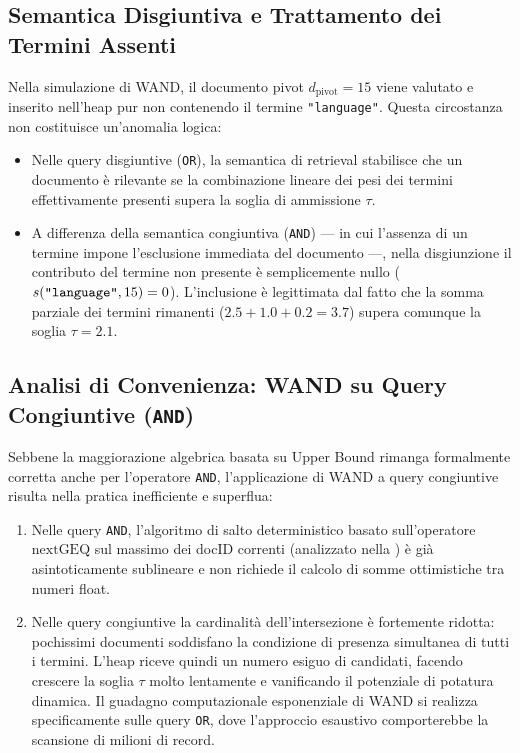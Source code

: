 \FloatBarrier
\subsection{Semantica Disgiuntiva e Trattamento dei Termini Assenti}
Nella simulazione di WAND, il documento pivot $d_{\text{pivot}} = 15$ viene valutato e inserito nell'heap pur non contenendo il termine \texttt{"language"}.  
Questa circostanza non costituisce un'anomalia logica:
\begin{itemize}
    \item Nelle query disgiuntive (\texttt{OR}), la semantica di retrieval stabilisce che un documento \`e rilevante se la combinazione lineare dei pesi dei termini effettivamente presenti supera la soglia di ammissione $\tau$.
    \item A differenza della semantica congiuntiva (\texttt{AND}) — in cui l'assenza di un termine impone l'esclusione immediata del documento —, nella disgiunzione il contributo del termine non presente \`e semplicemente nullo ($s(\text{\texttt{"language"}}, 15) = 0$). L'inclusione \`e legittimata dal fatto che la somma parziale dei termini rimanenti ($2.5 + 1.0 + 0.2 = 3.7$) supera comunque la soglia $\tau = 2.1$.
\end{itemize}

\FloatBarrier
\subsection{Analisi di Convenienza: WAND su Query Congiuntive (\texttt{AND})}
Sebbene la maggiorazione algebrica basata su Upper Bound rimanga formalmente corretta anche per l'operatore \texttt{AND}, l'applicazione di WAND a query congiuntive risulta nella pratica inefficiente e superflua:
\begin{enumerate}
    \item Nelle query \texttt{AND}, l'algoritmo di salto deterministico basato sull'operatore $\text{nextGEQ}$ sul massimo dei docID correnti (analizzato nella ) \`e gi\`a asintoticamente sublineare e non richiede il calcolo di somme ottimistiche tra numeri float.
    \item Nelle query congiuntive la cardinalit\`a dell'intersezione \`e fortemente ridotta: pochissimi documenti soddisfano la condizione di presenza simultanea di tutti i termini. L'heap riceve quindi un numero esiguo di candidati, facendo crescere la soglia $\tau$ molto lentamente e vanificando il potenziale di potatura dinamica. Il guadagno computazionale esponenziale di WAND si realizza specificamente sulle query \texttt{OR}, dove l'approccio esaustivo comporterebbe la scansione di milioni di record.
\end{enumerate}

